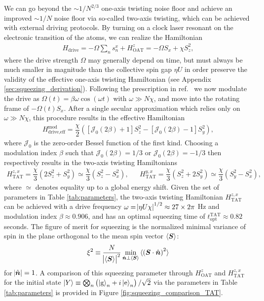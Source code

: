 \documentclass[aps,notitlepage,nofootinbib,11pt]{revtex4-1}
\renewcommand{\t}{\text} %
\newcommand{\f}[2]{\dfrac{#1}{#2}} %
\newcommand{\p}[1]{\left(#1\right)} %
\renewcommand{\sp}[1]{\left[#1\right]} %
\renewcommand{\v}{\bm} %
\renewcommand{\c}{\cdot} %
\newcommand{\bk}{\braket} %
\newcommand{\g}{\text{g}} %
\newcommand{\e}{\text{e}}
\newcommand{\J}{\mathcal{J}}
\newcommand{\1}{\mathds{1}}
\begin{document}
We can go beyond the $\sim1/N^{2/3}$ one-axis twisting noise floor and
achieve an improved $\sim1/N$ noise floor via so-called two-axis
twisting, which can be achieved with external driving protocols.  By
turning on a clock laser resonant on the electronic transition of the
atoms, we can realize the Hamiltonian
\begin{align}
  H_{\t{drive}} = -\Omega \sum_n s_n^x + H_{\t{OAT}}^z
  = -\Omega S_x + \chi S_z^2,
\end{align}
where the drive strength $\Omega$ may generally depend on time, but
must always be much smaller in magnitude than the collective spin gap
$\eta U$ in order preserve the validity of the effective one-axis
twisting Hamiltonian (see Appendix \ref{sec:squeezing_derivation}).
Following the prescription in ref.~\cite{huang2015twoaxis} we now
modulate the drive as $\Omega\p{t}=\beta\omega\cos\p{\omega t}$ with
$\omega\gg N\chi$, and move into the rotating frame of
$-\Omega\p{t}S_x$.  After a single secular approximation which relies
only on $\omega\gg N\chi$, this procedure results in the effective
Hamiltonian
\begin{align}
  H_{\t{drive,eff}}^{\t{mod}}
  = \f{\chi}{2} \p{\sp{\J_0\p{2\beta}+1} S_z^2
    - \sp{\J_0\p{2\beta}-1} S_y^2},
\end{align}
where $\J_0$ is the zero-order Bessel function of the first kind.
Choosing a modulation index $\beta$ such that $\J_0\p{2\beta}=1/3$ or
$\J_0\p{2\beta}=-1/3$ then respectively results in the two-axis
twisting Hamiltonians
\begin{align}
  H_{\t{TAT}}^{z,x}
  = \f{\chi}{3} \p{2 S_z^2 + S_y^2}
  \simeq \f{\chi}{3} \p{S_z^2 - S_x^2},
  &&
  H_{\t{TAT}}^{y,x}
  = \f{\chi}{3} \p{S_z^2 + 2 S_y^2}
  \simeq \f{\chi}{3}\p{S_y^2 - S_x^2},
  \label{eq:H_TAT_drive}
\end{align}
where $\simeq$ denotes equality up to a global energy shift.  Given
the set of parameters in Table \ref{tab:parameters}, the two-axis
twisting Hamiltonian $H_{\t{TAT}}^{z,x}$ can be achieved with a drive
frequency $\omega=\abs{\eta U\chi}^{1/2}\approx27\times2\pi$ Hz and
modulation index $\beta\approx0.906$, and has an optimal squeezing
time of $t_{\t{opt}}^{\t{TAT}}\approx0.82$ seconds.  The figure of
merit for squeezing is the normalized minimal variance of spin in the
plane orthogonal to the mean spin vector $\bk{\v S}$:
\begin{align}
  \xi^2 \equiv \f{N}{\abs{\bk{\v S}}^2}
  \min_{\hat{\v n}\perp\bk{\v S}} \bk{\p{\v S\c\hat{\v n}}^2}
\end{align}
for $\abs{\hat{\v n}}=1$.  A comparison of this squeezing parameter
through $H_{\t{OAT}}^z$ and $H_{\t{TAT}}^{z,x}$ for the initial state
$\ket{Y}\equiv\bigotimes_n\p{\ket{\g}_n+i\ket{\e}_n}/\sqrt2$ via the
parameters in Table \ref{tab:parameters} is provided in Figure
\ref{fig:squeezing_comparison_TAT}.
\end{document}
